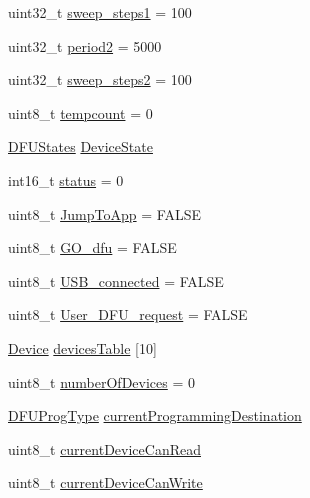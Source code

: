 \begin{DoxyCompactItemize}
uint32\-\_\-t \hyperlink{group___copter_control_b_l_ga594b91aa3e135c58969dc298b8acdeb3}{sweep\-\_\-steps1} = 100
\item 
uint32\-\_\-t \hyperlink{group___copter_control_b_l_gadf8633b43922fbf4f1d86981daf74ccc}{period2} = 5000
\item 
uint32\-\_\-t \hyperlink{group___copter_control_b_l_gac9cf28c40cee906b9405cb32f16b1fa2}{sweep\-\_\-steps2} = 100
\item 
uint8\-\_\-t \hyperlink{group___copter_control_b_l_ga61692259c50bf6def0bc56b1c2fd44b8}{tempcount} = 0
\item 
\hyperlink{group___copter_control_b_l_ga9a9e510f2da4e725074c7191d9d75d37}{\-D\-F\-U\-States} \hyperlink{group___copter_control_b_l_ga342208ed1954c6486eac389edf7c7f86}{\-Device\-State}
\item 
int16\-\_\-t \hyperlink{group___copter_control_b_l_ga2414697de79a243562514a0a4344a4dd}{status} = 0
\item 
uint8\-\_\-t \hyperlink{group___copter_control_b_l_ga6c435d21e1e77b6e71943e6ecac43154}{\-Jump\-To\-App} = \-F\-A\-L\-S\-E
\item 
uint8\-\_\-t \hyperlink{group___copter_control_b_l_ga45c9bb4b375b5f606e1ef13138fd01ae}{\-G\-O\-\_\-dfu} = \-F\-A\-L\-S\-E
\item 
uint8\-\_\-t \hyperlink{group___copter_control_b_l_gac2fd478a40cb67cd7b769eb34ed0a063}{\-U\-S\-B\-\_\-connected} = \-F\-A\-L\-S\-E
\item 
uint8\-\_\-t \hyperlink{group___copter_control_b_l_ga4e35257eb1d649bd7353cb4a4d37d5fb}{\-User\-\_\-\-D\-F\-U\-\_\-request} = \-F\-A\-L\-S\-E
\item 
\hyperlink{struct_device}{\-Device} \hyperlink{group___copter_control_b_l_ga0cfea7d81e98a1eed11dfb4e9fe16704}{devices\-Table} \mbox{[}10\mbox{]}
\item 
uint8\-\_\-t \hyperlink{group___copter_control_b_l_ga1b37428de16897c154a5b2c137f164fd}{number\-Of\-Devices} = 0
\item 
\hyperlink{group___copter_control_b_l_ga0137f05f9f13737114e6bd864c448688}{\-D\-F\-U\-Prog\-Type} \hyperlink{group___copter_control_b_l_gabbc56fe66ed81f83684d10b8cae06e82}{current\-Programming\-Destination}
\item 
uint8\-\_\-t \hyperlink{group___copter_control_b_l_ga2cee1725bfc6f9ac723c3decb193c8c2}{current\-Device\-Can\-Read}
\item 
uint8\-\_\-t \hyperlink{group___copter_control_b_l_ga1347c5307f6e1b00d3a65e06184d0e09}{current\-Device\-Can\-Write}
\item 

\end{DoxyCompactItemize}
